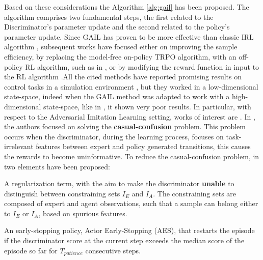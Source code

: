 Based on these considerations the Algorithm \ref{alg:gail} has been proposed. The algorithm comprises two fundamental steps, the first related to the Discriminator's parameter update and the second related to the policy's parameter update. Since GAIL has proven to be more effective than classic IRL algorithm \cite{ziebart2008maximum_entropy}, subsequent works have focused either on improving the sample efficiency, by replacing the model-free on-policy TRPO algorithm, with an off-policy RL algorithm, such as in \cite{kostrikov2018discriminator}, or by modifying the reward function in input to the RL algorithm \cite{fu2018airl,ghasemipour2020divergence_minimization_perspective}.All the cited methods have reported promising results on control tasks in a simulation environment \cite{brockman2016openai}, but they worked in a low-dimensional state-space, indeed when the GAIL method was adapted to work with a high-dimensional state-space, like in \cite{liu2018imitation_from_observation,reddy2019sqil,zolna2021task_relevant_ail,rafailov2021visual_ail}, it shown very poor results. In particular, with respect to the Adversarial Imitation Learning setting, works of interest are \cite{zolna2021task_relevant_ail,rafailov2021visual_ail}. In \cite{zolna2021task_relevant_ail}, the authors focused on solving the \textbf{casual-confusion} problem. This problem occurs when the discriminator, during the learning process, focuses on task-irrelevant features between expert and policy generated transitions, this causes the rewards to become uninformative. To reduce the casual-confusion problem, in \cite{zolna2021task_relevant_ail} two elements have been proposed: \begin{enumerate*}[label=(\textbf{\arabic*})]
    \item A regularization term, with the aim to make the discriminator \textbf{unable} to distinguish between constraining sets $I_{E}$ and $I_{A}$. The constraining sets are composed of expert and agent observations, such that a sample can belong either to $I_{E}$ or $I_{A}$, based on spurious features.  
    \item An early-stopping policy, Actor Early-Stopping (AES), that restarts the episode if the discriminator score at the current step exceeds the median score of the episode so far for $T_{patience}$ consecutive steps.

\end{enumerate*}
